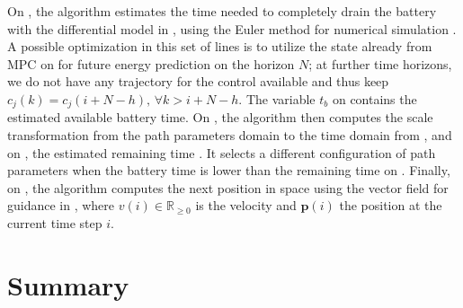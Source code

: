 On , the algorithm estimates the time needed to completely drain the battery with the differential model in 
, using the Euler method for numerical simulation %
. A possible optimization in this set of lines is to utilize the state already from MPC on  for future energy prediction on the horizon $N$; at further time horizons, we do not have any trajectory for the control available and thus keep  $c_j(k)=c_j(i+N-h),\,\forall k>i+N-h$. The variable $t_b$ on  contains the estimated available battery time. On , the algorithm then computes the scale transformation from the path parameters domain to the time domain from , and on , the estimated remaining time%
. It selects a different configuration of path parameters when the battery time is lower than the remaining time on . 
Finally, on , the algorithm computes the next position in space using the vector field for guidance in , where $v(i)\in\mathbb{R}_{\geq 0}$ is the velocity and $\mathbf{p}(i)$ the position at the current time step $i$. 



\section{\color{red}Summary}

